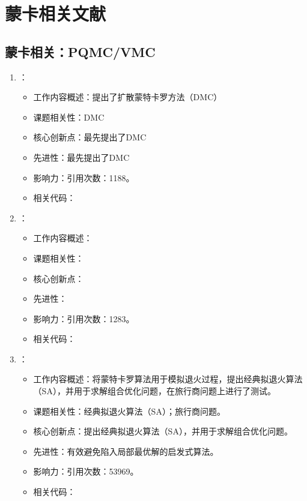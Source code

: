 \chapter{蒙卡相关文献}
\section{蒙卡相关：PQMC/VMC}
    \begin{enumerate}
        \item \citet{anderson1975random}：
            \begin{itemize}
                \item 工作内容概述：提出了扩散蒙特卡罗方法（DMC）
                \item 课题相关性：DMC
                \item 核心创新点：最先提出了DMC
                \item 先进性：最先提出了DMC
                \item 影响力：引用次数：1188。
                \item 相关代码：
            \end{itemize}
        \item \citet{reynolds1982fixed}：
        \begin{itemize}
            \item 工作内容概述：
            \item 课题相关性：
            \item 核心创新点：
            \item 先进性：
            \item 影响力：引用次数：1283。
            \item 相关代码：
        \end{itemize}
        \item \citet{kirkpatrick1983optimization}：
        \begin{itemize}
            \item 工作内容概述：将蒙特卡罗算法用于模拟退火过程，提出经典拟退火算法（SA），并用于求解组合优化问题，在旅行商问题上进行了测试。
            \item 课题相关性：经典拟退火算法（SA）；旅行商问题。
            \item 核心创新点：提出经典拟退火算法（SA），并用于求解组合优化问题。
            \item 先进性：有效避免陷入局部最优解的启发式算法。
            \item 影响力：引用次数：53969。
            \item 相关代码：

\end{itemize}
\end{enumerate}
